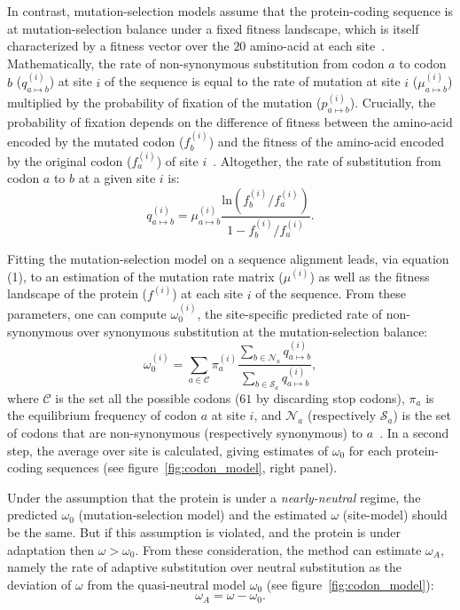 \documentclass{article}
\begin{document}
In contrast, mutation-selection models assume that the protein-coding sequence is at mutation-selection balance under a fixed fitness landscape, which is itself characterized by a fitness vector over the $20$ amino-acid at each site~\citep{yang_mutation-selection_2008, halpern_evolutionary_1998, rodrigue_mechanistic_2010}.
Mathematically, the rate of non-synonymous substitution from codon $a$ to codon $b$ ($q_{a \mapsto b}^{(i)}$) at site $i$ of the sequence is equal to the rate of mutation at site $i$ ($\mu_{a \mapsto b}^{(i)}$) multiplied by the probability of fixation of the mutation ($p_{a \mapsto b}^{(i)}$).
Crucially, the probability of fixation depends on the difference of fitness between the amino-acid encoded by the mutated codon ($f_b^{(i)}$) and the fitness of the amino-acid encoded by the original codon ($f_a^{(i)}$) of site $i$~\citep{wright_evolution_1931, fisher_genetical_1930}.
Altogether, the rate of substitution from codon $a$ to $b$ at a given site $i$ is:
\begin{equation}
	q_{a \mapsto b}^{(i)} = \mu_{a \mapsto b}^{(i)} \dfrac{\mathrm{ln}(f_b^{(i)} / f_a^{(i)})}{1 - f_b^{(i)} / f_a^{(i)}}.
\end{equation}

Fitting the mutation-selection model on a sequence alignment leads, via equation (1), to an estimation of the mutation rate matrix ($\mu^{(i)}$) as well as the fitness landscape of the protein ($f^{(i)}$) at each site $i$ of the sequence.
From these parameters, one can compute $\omega_{0}^{(i)}$, the site-specific predicted rate of non-synonymous over synonymous substitution at the mutation-selection balance:
\begin{equation}
	\omega_{0}^{(i)} = \sum_{a \in \mathcal{C}} \pi_a^{(i)} \dfrac{\sum_{b \in \mathcal{N}_a} q_{a \mapsto b}^{(i)}}{\sum_{b \in \mathcal{S}_a} q_{a \mapsto b}^{(i)}},
\end{equation}
where $\mathcal{C}$ is the set all the possible codons ($61$ by discarding stop codons), $\pi_a$ is the equilibrium frequency of codon $a$ at site $i$, and $\mathcal{N}_a$ (respectively $\mathcal{S}_a$) is the set of codons that are non-synonymous (respectively synonymous) to $a$~\citep{spielman_relationship_2015, rodrigue_detecting_2016}.
In a second step, the average over site is calculated, giving estimates of $\omega_0$ for each protein-coding sequences (see figure~\ref{fig:codon_model}, right panel).

Under the assumption that the protein is under a \textit{nearly-neutral} regime, the predicted $\omega_0$ (mutation-selection model) and the estimated $\omega$ (site-model) should be the same.
But if this assumption is violated, and the protein is under adaptation then $\omega > \omega_0$.
From these consideration, the method can estimate $\omega_A$, namely the rate of adaptive substitution over neutral substitution as the deviation of $\omega$ from the quasi-neutral model $\omega_0$ (see figure~\ref{fig:codon_model}):
\begin{equation}
	\omega_A = \omega - \omega_0.
\end{equation}
\end{document}
